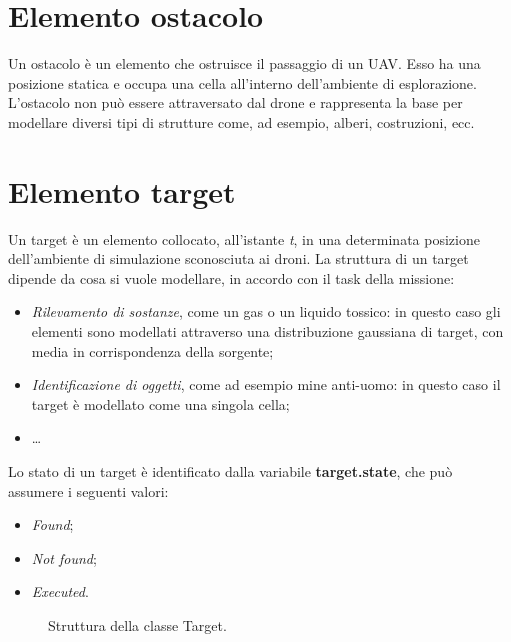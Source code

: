\section{Elemento ostacolo}

Un ostacolo è un elemento che ostruisce il passaggio di un UAV. 
Esso ha una posizione statica e occupa una cella all’interno dell’ambiente di esplorazione. 
L’ostacolo non può essere attraversato dal drone e rappresenta la base per modellare diversi tipi di strutture come, ad esempio, alberi, costruzioni, ecc.

\section {Elemento target}

Un target è un elemento collocato, all'istante \textit{t}, in una determinata posizione dell’ambiente di simulazione sconosciuta ai droni. 
La struttura di un target dipende da cosa si vuole modellare, in accordo con il task della missione:

\begin{itemize}
    \item \textit{Rilevamento di sostanze}, come un gas o un liquido tossico: in questo caso gli elementi sono modellati attraverso una distribuzione gaussiana di target, con media in corrispondenza della sorgente;
    \item \textit{Identificazione di oggetti}, come ad esempio mine anti-uomo: in questo caso il target è modellato come una singola cella;
    \item \dots
\end{itemize}

Lo stato di un target è identificato dalla variabile \textbf{target.state}, che può assumere i seguenti valori:

\begin{itemize}
    \item \textit{Found};
    \item \textit{Not found};
    \item \textit{Executed}.
\end{itemize}

\begin{figure}[H] 
    \captionsetup{justification=centering, margin=2cm, font=footnotesize}
    \begin{center}
    \end{center}
    \caption{Struttura della classe Target.}
    \label{classe_target}
\end{figure}

